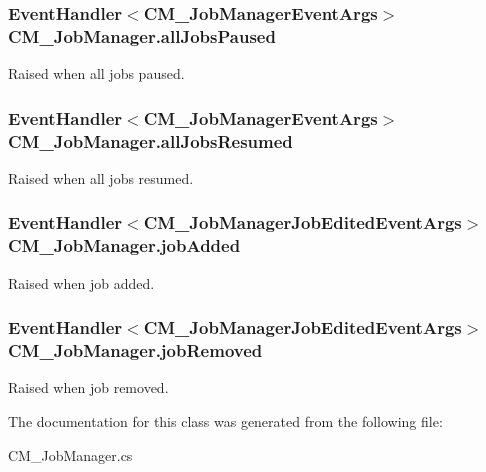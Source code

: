 \subsubsection[{all\+Jobs\+Paused}]{\setlength{\rightskip}{0pt plus 5cm}Event\+Handler$<${\bf C\+M\+\_\+\+Job\+Manager\+Event\+Args}$>$ C\+M\+\_\+\+Job\+Manager.\+all\+Jobs\+Paused\hspace{0.3cm}{\ttfamily [protected]}}\label{class_c_m___job_manager_a0dd6f2e0e4c7ead23dd25df03e23ddcb}


Raised when all jobs paused. 

\hypertarget{class_c_m___job_manager_a485232e2c1fe7cef56a53c20f74b638f}{}
\subsubsection[{all\+Jobs\+Resumed}]{\setlength{\rightskip}{0pt plus 5cm}Event\+Handler$<${\bf C\+M\+\_\+\+Job\+Manager\+Event\+Args}$>$ C\+M\+\_\+\+Job\+Manager.\+all\+Jobs\+Resumed\hspace{0.3cm}{\ttfamily [protected]}}\label{class_c_m___job_manager_a485232e2c1fe7cef56a53c20f74b638f}


Raised when all jobs resumed. 

\hypertarget{class_c_m___job_manager_a0f3c4dff8b782e1b64abcbb7dc19cd8a}{}
\subsubsection[{job\+Added}]{\setlength{\rightskip}{0pt plus 5cm}Event\+Handler$<${\bf C\+M\+\_\+\+Job\+Manager\+Job\+Edited\+Event\+Args}$>$ C\+M\+\_\+\+Job\+Manager.\+job\+Added\hspace{0.3cm}{\ttfamily [protected]}}\label{class_c_m___job_manager_a0f3c4dff8b782e1b64abcbb7dc19cd8a}


Raised when job added. 

\hypertarget{class_c_m___job_manager_a3a24d267ce0e6a09a2cf8f13429f2b73}{}
\subsubsection[{job\+Removed}]{\setlength{\rightskip}{0pt plus 5cm}Event\+Handler$<${\bf C\+M\+\_\+\+Job\+Manager\+Job\+Edited\+Event\+Args}$>$ C\+M\+\_\+\+Job\+Manager.\+job\+Removed\hspace{0.3cm}{\ttfamily [protected]}}\label{class_c_m___job_manager_a3a24d267ce0e6a09a2cf8f13429f2b73}


Raised when job removed. 



The documentation for this class was generated from the following file\+:\begin{DoxyCompactItemize}
\item 
C\+M\+\_\+\+Job\+Manager.\+cs\end{DoxyCompactItemize}
